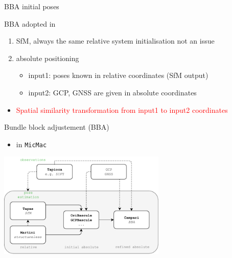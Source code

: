\documentclass{beamer}
\begin{document}
	\begin{frame}{BBA initial poses}
	
	BBA adopted in
	\begin{enumerate}
		\item<1-> SfM, always the same relative system initialisation not an issue
		\item<2-> absolute positioning
		\begin{itemize}
			\item<2-> input1: poses known in relative coordinates (SfM output)
			\item<2-> input2: GCP, GNSS are given in absolute coordinates
		\end{itemize}							
	\end{enumerate}		
	
 	\footnotesize
	\begin{itemize}
		\item<3-> \textcolor{red}{Spatial similarity transformation from input1 to input2 coordinates}
	\end{itemize}		 

		
		
	\end{frame}
	
	
		\begin{frame}{Bundle block adjustement (BBA)}

		\begin{itemize}
			\item in \texttt{MicMac}
		\end{itemize}
				
		\centering 
		\includegraphics[width=8cm]{images/MicMac_pose_estim_architecture.pdf}	
		
		\end{frame}	
\end{document}
